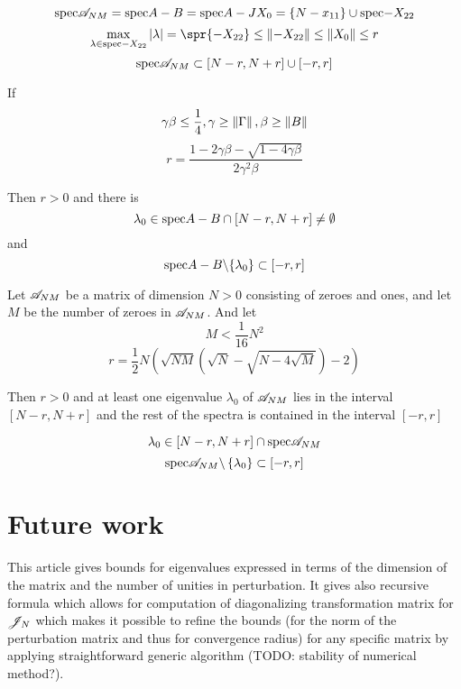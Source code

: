 \documentclass{article}
\begin{document}
\begin{propose}
    \[ \mathrm{spec} {\mathscr{A}_{{N}{M}}} = \mathrm{spec} {A-B} = \mathrm{spec} {A-JX_0} = \{N - x_{11}\} \cup \mathrm{spec} {-X_{22}} \]
    \[ \max_{\lambda\in\spec{-X_{22}}} \left|\lambda\right| = \spr{-X_{22}} \leq \norm{-X_{22}} \leq \norm{X_0} \leq r \]
    \[ \mathrm{spec} {\mathscr{A}_{{N}{M}}} \subset \left[N-r, N+r\right] \cup \left[-r, r\right] \]
\end{propose}

\begin{lemma}
    If
    \[\gamma\beta\leq\frac14, \gamma\geq\left\|{\Gamma}\right\|, \beta\geq\left\|{B}\right\|\]
    \[r = \frac{1 - 2\gamma\beta - \sqrt{1-4\gamma\beta}}{2 \gamma^2 \beta}\]

    Then $r>0$ and there is
	\[ \lambda_0\in\mathrm{spec} {A-B} \cap \left[N-r,N+r\right] \neq\emptyset \]
	and
	\[ \mathrm{spec} {A-B}\backslash\{\lambda_0\} \subset \left[-r,r\right] \]
\end{lemma}
\begin{thm}
    Let \( \mathscr{A}_{{N}{M}} \) be a matrix of dimension \( N>0 \) consisting of zeroes and ones,
    and let \( M \) be the number of zeroes in \( \mathscr{A}_{{N}{M}} \).
    And let
    \[ M < \frac{1}{16} N^2 \]
    \[ r = \frac12 N
        \left(
        \sqrt{NM}(\sqrt{N} - \sqrt{N-4\sqrt{M}}) - 2
        \right) \]

    Then $r>0$ and at least one eigenvalue \( \lambda_0 \) of \( \mathscr{A}_{{N}{M}} \) lies in the interval \(\left[N-r,N+r\right]\)
	and the rest of the spectra is contained in the interval \( \left[-r,r\right] \)

    \[ \lambda_0 \in \left[N-r, N+r\right] \cap \mathrm{spec} {\mathscr{A}_{{N}{M}}} \]
    \[ \mathrm{spec} {\mathscr{A}_{{N}{M}}} \backslash \left\{\lambda_0\right\} \subset \left[-r,r\right] \]
\end{thm}

\section{Future work}
This article gives bounds for eigenvalues expressed in terms of the dimension of the matrix and the number of unities in perturbation.
It gives also recursive formula which allows for computation of diagonalizing transformation matrix for \( \mathscr{J}_{N} \)
which makes it possible to refine the bounds (for the norm of the perturbation matrix and thus for convergence radius)
for any specific matrix by applying straightforward generic algorithm (TODO: stability of numerical method?).
\end{document}
